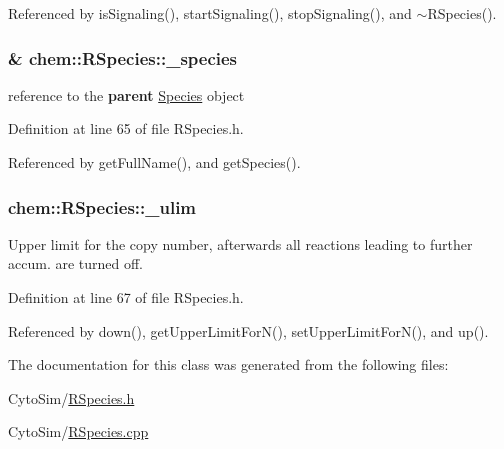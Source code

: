Referenced by is\-Signaling(), start\-Signaling(), stop\-Signaling(), and $\sim$\-R\-Species().

\hypertarget{classchem_1_1RSpecies_a3a979b9226800417c7aad81a2162fac5}{
\subsubsection[{\-\_\-species}]{\& {\bf chem\-::\-R\-Species\-::\-\_\-species}}}\label{classchem_1_1RSpecies_a3a979b9226800417c7aad81a2162fac5}


reference to the {\bfseries parent} \hyperlink{classchem_1_1Species}{Species} object 



Definition at line 65 of file R\-Species.\-h.



Referenced by get\-Full\-Name(), and get\-Species().

\hypertarget{classchem_1_1RSpecies_a189084cfe75e004f42a6a27b2c1c09ad}{
\subsubsection[{\-\_\-ulim}]{ {\bf chem\-::\-R\-Species\-::\-\_\-ulim}}}\label{classchem_1_1RSpecies_a189084cfe75e004f42a6a27b2c1c09ad}


Upper limit for the copy number, afterwards all reactions leading to further accum. are turned off. 



Definition at line 67 of file R\-Species.\-h.



Referenced by down(), get\-Upper\-Limit\-For\-N(), set\-Upper\-Limit\-For\-N(), and up().



The documentation for this class was generated from the following files\-:\begin{DoxyCompactItemize}
\item 
Cyto\-Sim/\hyperlink{RSpecies_8h}{R\-Species.\-h}\item 
Cyto\-Sim/\hyperlink{RSpecies_8cpp}{R\-Species.\-cpp}\end{DoxyCompactItemize}
